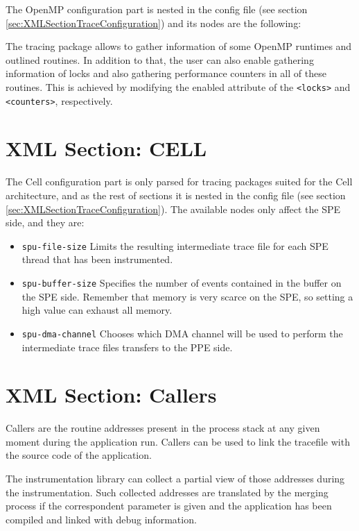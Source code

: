 The OpenMP configuration part is nested in the config file (see section \ref{sec:XMLSectionTraceConfiguration}) and its nodes are the following:



The tracing package allows to gather information of some OpenMP runtimes and outlined routines. In addition to that, the user can also enable gathering information of locks and also gathering performance counters in all of these routines. This is achieved by modifying the enabled attribute of the {\tt <locks>} and {\tt <counters>}, respectively.

\section{XML Section: CELL}\label{sec:XMLcell}

The Cell configuration part is only parsed for tracing packages suited for the Cell architecture, and as the rest of sections it is nested in the config file (see section \ref{sec:XMLSectionTraceConfiguration}). The available nodes only affect the SPE side, and they are:



\begin{itemize}
 \item {\tt spu-file-size} Limits the resulting intermediate trace file for each SPE thread that has been instrumented.
 \item {\tt spu-buffer-size} Specifies the number of events contained in the buffer on the SPE side. Remember that memory is very scarce on the SPE, so setting a high value can exhaust all memory.
 \item {\tt spu-dma-channel} Chooses which {DMA} channel will be used to perform the intermediate trace files transfers to the PPE side.
\end{itemize}

\section{XML Section: Callers}\label{sec:XMLSectionCallers}



Callers are the routine addresses present in the process stack at any given moment during the application run. Callers can be used to link the tracefile with the source code of the application.

The instrumentation library can collect a partial view of those addresses during the instrumentation. Such collected addresses are translated by the merging process if the correspondent parameter is given and the application has been compiled and linked with debug information.

